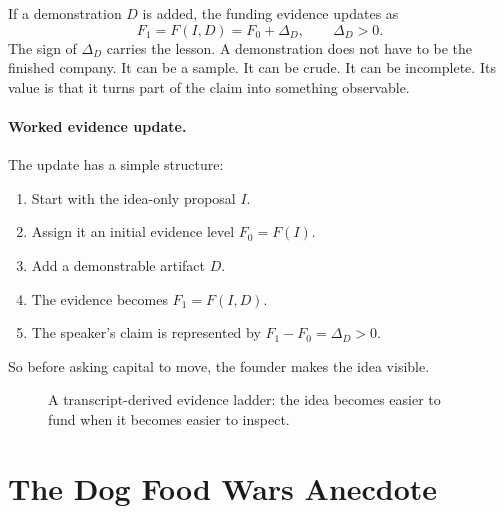 If a demonstration \(D\) is added, the funding evidence updates as
\begin{equation}
F_1 = F(I,D)=F_0+\Delta_D,
\qquad
\Delta_D>0.
\end{equation}
The sign of \(\Delta_D\) carries the lesson. A demonstration does not have to be the finished company. It can be a sample. It can be crude. It can be incomplete. Its value is that it turns part of the claim into something observable.

\paragraph{Worked evidence update.}
The update has a simple structure:
\begin{enumerate}
\item Start with the idea-only proposal \(I\).
\item Assign it an initial evidence level \(F_0=F(I)\).
\item Add a demonstrable artifact \(D\).
\item The evidence becomes \(F_1=F(I,D)\).
\item The speaker's claim is represented by \(F_1-F_0=\Delta_D>0\).
\end{enumerate}
So before asking capital to move, the founder makes the idea visible.

\begin{figure}
\centering
{}
\caption{A transcript-derived evidence ladder: the idea becomes easier to fund when it becomes easier to inspect.}
\end{figure}

\section{The Dog Food Wars Anecdote}

